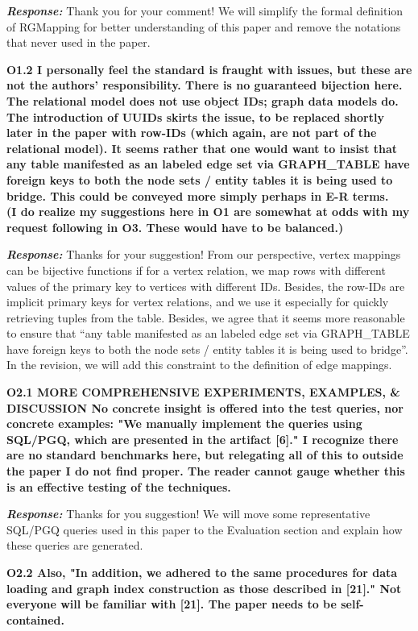 \textbf{\textit{Response: }}
Thank you for your comment! We will simplify the formal definition of RGMapping for better understanding of this paper and remove the notations that never used in the paper.


\textbf{
O1.2 I personally feel the standard is fraught with issues, but these are not the authors' responsibility. There is no guaranteed bijection here. The relational model does not use object IDs; graph data models do. The introduction of UUIDs skirts the issue, to be replaced shortly later in the paper with row-IDs (which again, are not part of the relational model). It seems rather that one would want to insist that any table manifested as an labeled edge set via GRAPH\_TABLE have foreign keys to both the node sets / entity tables it is being used to bridge. This could be conveyed more simply perhaps in E-R terms. \\
(I do realize my suggestions here in O1 are somewhat at odds with my request following in O3. These would have to be balanced.)}

\textbf{\textit{Response: }}
Thanks for your suggestion! From our perspective, vertex mappings can be bijective functions if for a vertex relation, we map rows with different values of the primary key to vertices with different IDs. Besides, the row-IDs are implicit primary keys for vertex relations, and we use it especially for quickly retrieving tuples from the table. Besides, we agree that it seems more reasonable to ensure that ``any table manifested as an labeled edge set via GRAPH\_TABLE have foreign keys to both the node sets / entity tables it is being used to bridge''. In the revision, we will add this constraint to the definition of edge mappings.


\textbf{O2.1 MORE COMPREHENSIVE EXPERIMENTS, EXAMPLES, \& DISCUSSION
No concrete insight is offered into the test queries, nor concrete examples: "We manually implement the queries using SQL/PGQ, which are presented in the artifact [6]." I recognize there are no standard benchmarks here, but relegating all of this to outside the paper I do not find proper. The reader cannot gauge whether this is an effective testing of the techniques. }

\textbf{\textit{Response: }}
Thanks for you suggestion! We will move some representative SQL/PGQ queries used in this paper to the Evaluation section and explain how these queries are generated.


\textbf{
O2.2 Also, "In addition, we adhered to the same procedures for data loading and graph index construction as those described in [21]." Not everyone will be familiar with [21]. The paper needs to be self-contained. }

